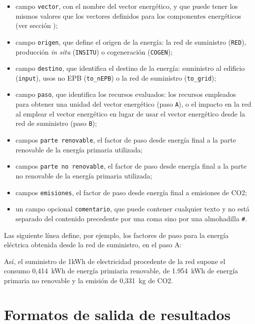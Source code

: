 \documentclass[10pt,notitlepage,oneside,a4paper]{article}
\begin{document}
\begin{itemize}
\item campo \texttt{vector}, con el nombre del vector energético, y que puede tener los mismos valores que los vectores definidos para los componentes energéticos (ver sección );
\item campo \texttt{origen}, que define el origen de la energía: la red de suministro (\texttt{RED}), producción \textit{in situ} (\texttt{INSITU}) o cogeneración (\texttt{COGEN});
\item campo \texttt{destino}, que identifica el destino de la energía: suministro al edificio (\texttt{input}), usos no EPB (\texttt{to\_nEPB}) o la red de suministro (\texttt{to\_grid});
\item campo \texttt{paso}, que identifica los recursos evaluados: los recursos empleados para obtener una unidad del vector energético (paso \texttt{A}), o el impacto en la red al emplear el vector energético en lugar de usar el vector energético desde la red de suministro (paso \texttt{B});
\item campos \texttt{parte renovable}, el factor de paso desde energía final a la parte renovable de la energía primaria utilizada;
\item campos \texttt{parte no renovable}, el factor de paso desde energía final a la parte no renovable de la energía primaria utilizada;
\item campos \texttt{emisiones}, el factor de paso desde energía final a emisiones de CO2;
\item un campo opcional \texttt{comentario}, que puede contener cualquier texto y no está separado del contenido precedente por una coma sino por una almohadilla \texttt{\#}.
\end{itemize}

Las siguiente línea define, por ejemplo,  los factores de paso para la energía eléctrica obtenida desde la red de suministro, en el paso A:



Así, el suministro de 1kWh de electricidad procedente de la red supone el consumo 0,414~kWh de energía primiaria renovable, de 1.954~kWh de energía primaria no renovable y la emisión de 0,331~kg de CO2.

\clearpage
\newpage
\section{Formatos de salida de resultados}\label{sec:formatosalida}
\end{document}
